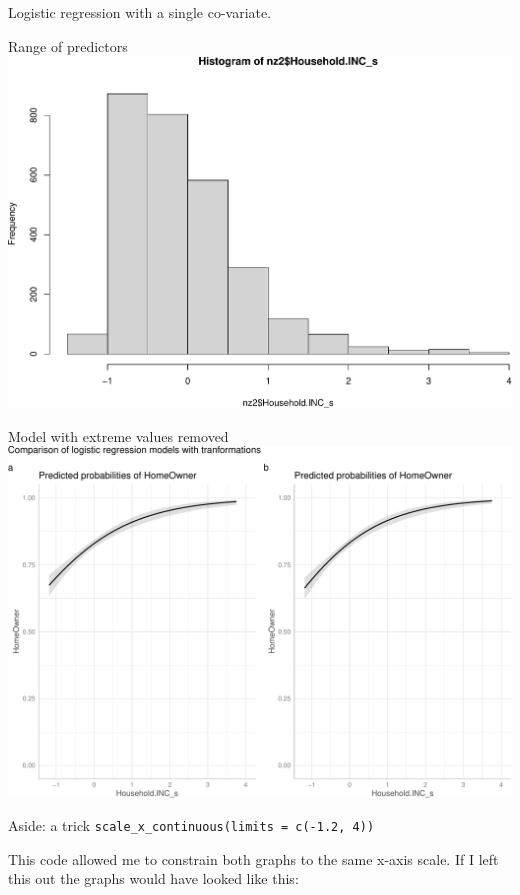 \documentclass[
  ignorenonframetext,
]{beamer}
\begin{document}
\begin{frame}[fragile]{Logistic regression with a single co-variate.}
\begin{block}{Range of predictors}
\protect\hypertarget{range-of-predictors}{}
\includegraphics{slides_files/figure-beamer/unnamed-chunk-16-1.pdf}
\end{block}

\begin{block}{Model with extreme values removed}
\protect\hypertarget{model-with-extreme-values-removed}{}
\includegraphics{slides_files/figure-beamer/unnamed-chunk-17-1.pdf}
\end{block}

\begin{block}{Aside: a trick}
\protect\hypertarget{aside-a-trick}{}
\texttt{scale\_x\_continuous(limits\ =\ c(-1.2,\ 4))}

This code allowed me to constrain both graphs to the same x-axis scale.
If I left this out the graphs would have looked like this:


\end{block}
\end{frame}
\end{document}
